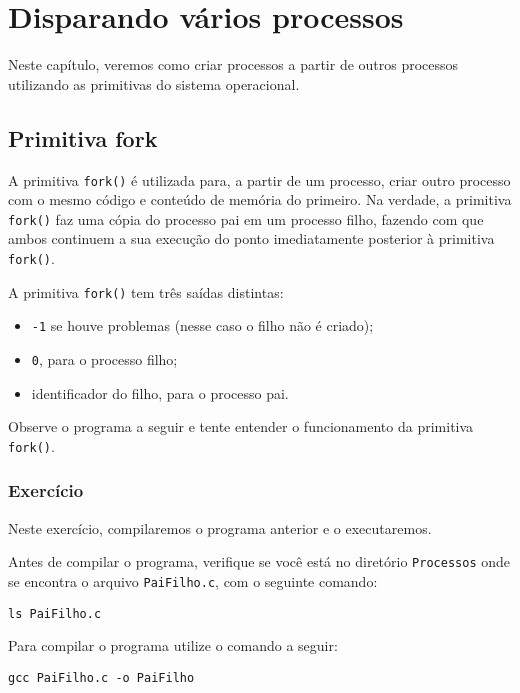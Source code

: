 \chapter{Disparando vários processos}
Neste capítulo, veremos como criar processos a partir de outros processos utilizando as primitivas do sistema operacional.

\section{Primitiva fork}
A primitiva \texttt{fork()} é utilizada para, a partir de um processo, criar outro processo com o mesmo código e conteúdo de memória do primeiro. Na verdade, a primitiva \texttt{fork()} faz uma cópia do processo pai em um processo filho, fazendo com que ambos continuem a sua execução do ponto imediatamente posterior à  primitiva \texttt{fork()}.

A primitiva \texttt{fork()} tem três saídas distintas:
\begin{itemize}
\setlength{\itemsep}{1pt}\setlength{\parskip}{0pt}  \setlength{\parsep}{0pt}
\item \texttt{-1} se houve problemas (nesse caso o filho não é criado);
\item \texttt{0}, para o processo filho;
\item identificador do filho, para o processo pai.
\end{itemize}

Observe o programa a seguir e tente entender o funcionamento da primitiva \texttt{fork()}.



\subsection{Exercício}
Neste exercício, compilaremos o programa anterior e o executaremos.

Antes de compilar o programa, verifique se você está no diretório \texttt{Processos} onde se encontra o arquivo  \texttt{PaiFilho.c}, com o seguinte comando:

\begin{lstlisting}[style=MyBashStyle]
ls PaiFilho.c
\end{lstlisting}

Para compilar o programa utilize o comando a seguir:
\begin{lstlisting}[style=MyBashStyle]
gcc PaiFilho.c -o PaiFilho
\end{lstlisting}

